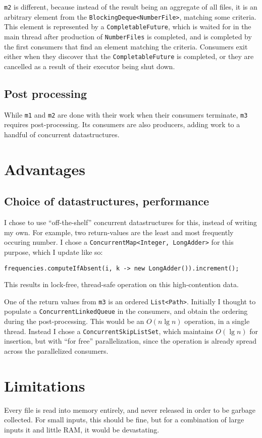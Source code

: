 \documentclass[a4paper,11pt]{article}
\begin{document}
\texttt{m2} is different, because instead of the result being an
aggregate of all files, it is an arbitrary element from the
\texttt{BlockingDeque<NumberFile>}, matching some criteria.  This element
is represented by a \texttt{CompletableFuture}, which is waited for in
the main thread after production of \texttt{NumberFiles} is completed,
and is completed by the first consumers that find an element matching
the criteria.  Consumers exit either when they discover that the
\texttt{CompletableFuture} is completed, or they are cancelled as a
result of their executor being shut down.

\subsection{Post processing}

While \texttt{m1} and \texttt{m2} are done with their work when their
consumers terminate, \texttt{m3} requires post-processing.  Its
consumers are also producers, adding work to a handful of concurrent
datastructures.   

\section{Advantages}

\subsection{Choice of datastructures, performance}

I chose to use ``off-the-shelf'' concurrent datastructures for this,
instead of writing my own.  For example, two return-values are the
least and most frequently occuring number.  I chose a
\texttt{ConcurrentMap<Integer, LongAdder>} for this purpose, which I
update like so:

\begin{verbatim}
frequencies.computeIfAbsent(i, k -> new LongAdder()).increment();
\end{verbatim}

This results in lock-free, thread-safe operation on this
high-contention data.

One of the return values from \texttt{m3} is an ordered
\texttt{List<Path>}.  Initially I thought to populate a
\texttt{ConcurrentLinkedQueue} in the consumers, and obtain the
ordering during the post-processing.  This would be an \(O(n \lg n) \)
operation, in a single thread.  Instead I chose a
\texttt{ConcurrentSkipListSet}, which maintains $O(\lg n)$ for
insertion, but with ``for free'' parallelization, since the operation
is already spread across the parallelized consumers.

\section{Limitations}

Every file is read into memory entirely, and never released in order
to be garbage collected.  For small inputs, this should be fine, but
for a combination of large inputs it and little RAM, it would be
devastating.
\end{document}
